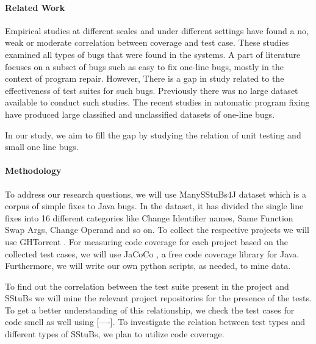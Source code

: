 \documentclass[11pt]{article}
\begin{document}
\paragraph{Related Work}
Empirical studies \cite{gren2017relation, antinyan2018mythical, inozemtseva2014coverage} at different scales and under different settings have found a no, weak or moderate correlation between coverage and test case. These studies examined all types of bugs that were found in the systems. A part of literature focuses on a subset of bugs such as easy to fix one-line bugs, mostly in the context of program repair. However, There is a gap in study related to the effectiveness of test suites for such bugs. Previously there was no large dataset available to conduct such studies. The recent studies in automatic program fixing have produced large classified \cite{karampatsis2020often} and unclassified \cite{chen2019sequencer} datasets of one-line bugs.  

In our study, we aim to fill the gap by studying the relation of unit testing and small one line bugs. 



\paragraph{Methodology}

To address our research questions, we will use ManySStuBs4J\cite{karampatsis2020often} dataset which is a corpus of simple fixes to Java bugs. In the dataset, it has divided the single line fixes into 16 different categories like Change Identifier names, Same Function Swap Args, Change Operand and so on. To collect the respective projects we will use GHTorrent \cite{Gousi13}. For measuring code coverage for each project based on the collected test cases, we will use JaCoCo \cite{noauthor_eclemma_nodate}, a free code coverage library for Java. Furthermore, we will write our own python scripts, as needed, to mine data.

To find out the correlation between the test suite present in the project and SStuBs we will mine the relevant project repositories for the presence of the tests. To get a better understanding of this relationship, we check the test cases for code smell as well using [----]. To investigate the relation between test types and different types of SStuBs, we plan to utilize code coverage. 




\end{document}
